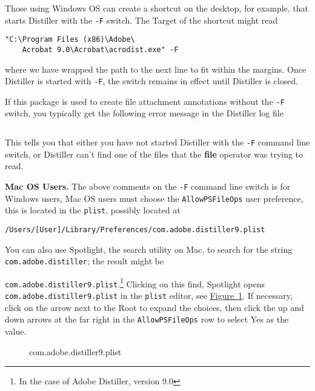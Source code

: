 \documentclass[12pt]{article}
\makeatletter
\let\app\textsf
\let\uif\textsf
\renewenvironment{quote}[1][]
   {\def\@rgi{#1}\ifx\@rgi\@empty
    \let\rghtm\@empty\else\def\rghtm{\rightmargin\leftmargin}\fi
    \list{}{\rghtm} %
    \item\relax}
   {\endlist}
\makeatother
\begin{document}
Those using \app{Windows OS} can create a shortcut on the desktop, for example,
that starts \app{Distiller} with the \texttt{-F} switch. The \uif{Target} of the shortcut might read
\begin{Verbatim}[xleftmargin=\leftmargini,fontsize=\small]
"C:\Program Files (x86)\Adobe\
    Acrobat 9.0\Acrobat\acrodist.exe" -F
\end{Verbatim}
where we have wrapped the path to the next line to fit within the margins.
Once \app{Distiller} is started with \texttt{-F}, the switch remains in effect
until \app{Distiller} is closed.

If this package is used to create file attachment annotations without the
\texttt{-F} switch, you typically get the following error message in
the Distiller log file
\begin{Verbatim}[xleftmargin=\leftmargini,fontsize=\small]
%%[ Error: undefinedfilename; OffendingCommand: file ]%%
\end{Verbatim}
This tells you that either you have not started Distiller with the
\texttt{-F} command line switch, or Distiller can't find one of the
files that the \textbf{file} operator was trying to read.



\newtopic \textbf{Mac OS Users.} The above comments on the \texttt{-F} command line switch
is for Windows users, Mac OS users must choose the \texttt{AllowPSFileOps} user preference, this is located
in the \texttt{plist}, possibly located at
\begin{Verbatim}[fontsize=\small]
/Users/[User]/Library/Preferences/com.adobe.distiller9.plist
\end{Verbatim}
You can also use Spotlight, the search utility on Mac, to search for the string \texttt{com.adobe.distiller};
the result might be
\begin{quote}
\texttt{com.adobe.distiller9.plist}.\footnote{In the case of Adobe Distiller, version 9.0}
\end{quote}
Clicking on this find,
Spotlight opens \texttt{com.adobe.distiller9.plist} in the \texttt{plist} editor, see \hyperref[plist]{Figure~\ref*{plist}}.
If necessary, click on the arrow next to the Root to expand the
choices, then click the up and down arrows at the far
right in the \texttt{AllowPSFileOps} row to select Yes as the value.
\begin{figure}[hbt]\setlength{\fboxsep}{0pt}
\begin{center}
\caption{com.adobe.distiller9.plist}\label{plist}
\end{center}
\end{figure}
\end{document}
